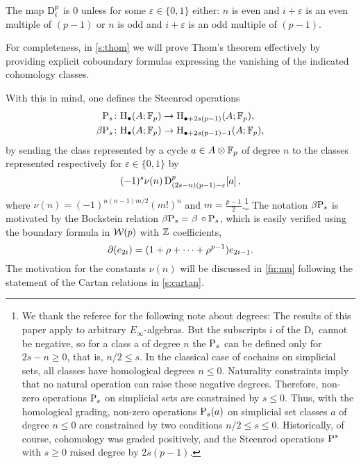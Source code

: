 \begin{theorem}[Thom]\label{t:thom}
	The map $\mathrm{D}_i^p$ is $0$ unless for some $\varepsilon \in \{0,1\}$ either: $n$ is even and $i+\varepsilon$ is an even multiple of $(p-1)$ or $n$ is odd and $i+\varepsilon$ is an odd multiple of $(p-1)$.
\end{theorem}

For completeness, in \cref{s:thom} we will prove Thom's theorem effectively by providing explicit coboundary formulas expressing the vanishing of the indicated cohomology classes.

With this in mind, one defines the Steenrod operations
\begin{align*}
	\mathrm{P}_s \colon& \mathrm{H}_\bullet(A; {\mathbb{F}_p}) \to \mathrm{H}_{\bullet + 2s(p-1)}(A; {\mathbb{F}_p}), \\
	\beta \mathrm{P}_s \colon& \mathrm{H}_\bullet(A; {\mathbb{F}_p}) \to \mathrm{H}_{\bullet + 2s(p-1) - 1}(A; {\mathbb{F}_p}),
\end{align*}
by sending the class represented by a cycle $a \in A \otimes {\mathbb{F}_p}$ of degree $n$ to the classes represented respectively for $\varepsilon \in \{0,1\}$ by
\[
(-1)^s \nu(n) \, \mathrm{D}^p_{(2s-n)(p-1)-\varepsilon}[a] \,,
\]
where $\nu(n) = (-1)^{n(n-1)m/2}(m!)^n$ and $m = \frac{p-1}{2}$.\footnote{
	We thank the referee for the following note about degrees:
	The results of this paper apply to arbitrary $E_\infty$-algebras.
	But the subscripts $i$ of the $\mathrm{D}_i$ cannot be negative, so for a class a of degree $n$ the $\mathrm{P}_s$ can be defined only for $2s-n \geq 0$, that is, $n/2 \leq s$.
	In the classical case of cochains on simplicial sets, all classes have homological degrees $n \leq 0$.
	Naturality constraints imply that no natural operation can raise these negative degrees.
	Therefore, non-zero operations $\mathrm{P}_s$ on simplicial sets are constrained by $s \leq 0$.
	Thus, with the homological grading, non-zero operations $\mathrm{P}_s(a)$ on simplicial set classes $a$ of degree $n \leq 0$ are constrained by two conditions $n/2 \leq s \leq 0$.
	Historically, of course, cohomology was graded positively, and the Steenrod operations $\mathrm{P}^s$ with $s \geq 0$ raised degree by $2s(p-1)$.
}
The notation $\beta \mathrm{P}_s$ is motivated by the Bockstein relation $\beta \mathrm{P}_s = \beta\, \mathbin{\circ} \mathrm{P}_s$, which is easily verified using the boundary formula in $\mathcal{W}(p)$ with $\mathbb{Z}$ coefficients,
\[
\operatorname{\partial}(e_{2i}) = (1 + \rho + \dots + \rho^{p-1})e_{2i-1}.
\]
The motivation for the constants $\nu(n)$ will be discussed in \cref{fn:mu} following the statement of the Cartan relations in \cref{s:cartan}.